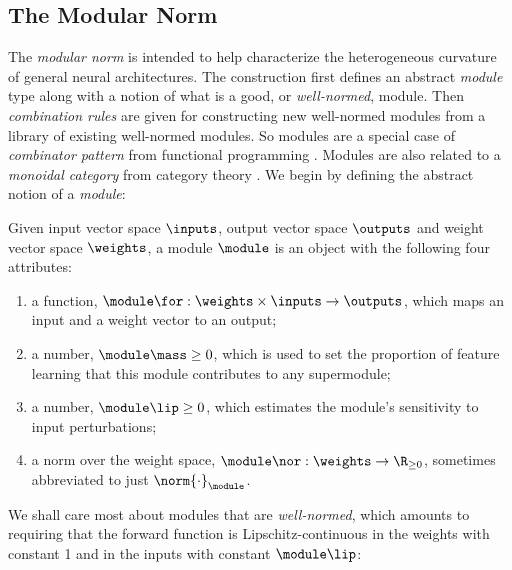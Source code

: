 \subsection{The Modular Norm}
\label{sec:modular-norm}

The \textit{modular norm} \citep{modula} is intended to help characterize the heterogeneous curvature of general neural architectures. The construction first defines an abstract \textit{module} type along with a notion of what is a good, or \textit{well-normed}, module. Then \textit{combination rules} are given for constructing new well-normed modules from a library of existing well-normed modules. So modules are a special case of \textit{combinator pattern} from functional programming \citep{haskellwiki_combinator}. Modules are also related to a \textit{monoidal category} from category theory \citep{fong2019invitation}. We begin by defining the abstract notion of a \textit{module}:

\begin{mydefinition}[Module]\label{def:module} Given input vector space $\inputs$, output vector space $\outputs$ and weight vector space $\weights$, a module $\module$ is an object with the following four attributes:
\begin{enumerate}[label=\normalfont(\alph*)]
\setlength\itemsep{0em}
    \item a function, $\module\for: \weights\times\inputs\to\outputs$, which maps an input and a weight vector to an output;
    \item a number, $\module\mass\geq0$, which is used to set the proportion of feature learning that this module contributes to any supermodule;
    \item a number, $\module\lip \geq0$, which estimates the module's sensitivity to input perturbations;
    \item a norm over the weight space, $\module\nor : \weights \to \R_{\geq0}$, sometimes abbreviated to just $\norm{\cdot}_\module$.
\end{enumerate}
\end{mydefinition}
We shall care most about modules that are \textit{well-normed}, which amounts to requiring that the forward function is Lipschitz-continuous in the weights with constant 1 and in the inputs with constant $\module\lip$:

